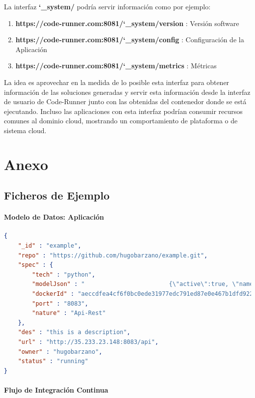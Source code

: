 \documentclass[a4paper,11pt]{book}
\begin{document}
La interfaz \textbf{\char`_system/} podría servir información como por ejemplo:

\begin{enumerate}
\item\textbf{ https://code-runner.com:8081/\char`_system/version }: Versión software
\item \textbf{https://code-runner.com:8081/\char`_system/config }: Configuración de la Aplicación
\item \textbf{https://code-runner.com:8081/\char`_system/metrics }: Métricas 
\end{enumerate}

La idea es aprovechar en la medida de lo posible esta interfaz para obtener información de las soluciones generadas y servir esta información desde la interfaz de usuario de Code-Runner junto con las obtenidas del contenedor donde se está ejecutando. Incluso las aplicaciones con esta interfaz podrían consumir recursos comunes al dominio cloud, mostrando un comportamiento de plataforma o de sistema cloud. 

\chapter{ Anexo}

\section{Ficheros de Ejemplo}

\subsubsection{Modelo de Datos:  Aplicación}\label{anexmodel}


\begin{lstlisting}[language=json,firstnumber=1]
{
    "_id" : "example",
    "repo" : "https://github.com/hugobarzano/example.git",
    "spec" : {
        "tech" : "python",
        "modelJson" : "                        {\"active\":true, \"name\":\"thing name\", \"value\":33}\r\n                    ",
        "dockerId" : "aeccdfea4cf6f0bc0ede31977edc791ed87e0e467b1dfd9222005e63feff8598",
        "port" : "8083",
        "nature" : "Api-Rest"
    },
    "des" : "this is a description",
    "url" : "http://35.233.23.148:8083/api",
    "owner" : "hugobarzano",
    "status" : "running"
}
\end{lstlisting}

\subsubsection{Flujo de Integración Continua}\label{anexci}
\end{document}
